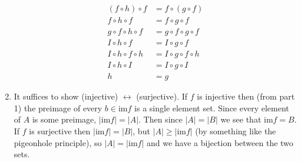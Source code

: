 \documentclass[]{article}
\newcommand{\abs}[1]{\left\vert #1 \right\vert}
\begin{document}
\begin{enumerate}
\begin{align}
(f \circ h) \circ f &= f \circ (g \circ f) \\
f \circ h \circ f &= f \circ g \circ f \\
g \circ f \circ h \circ f &= g \circ f \circ g \circ f \\
I \circ h \circ f &= I \circ g \circ f \\
I \circ h \circ f \circ h &= I \circ g \circ f \circ h \\
I \circ h \circ I &= I \circ g \circ I \\
h &= g
\end{align}
\item It suffices to show (injective) $\leftrightarrow$ (surjective). If $f$ is injective then (from part 1) the preimage of every $b \in \text{im}f$ is a single element set. Since every element of $A$ is some preimage, $\abs{\text{im}f} = \abs{A}$. Then since $\abs{A} = \abs{B}$ we see that $\text{im}f = B$. If $f$ is surjective then $\abs{\text{im}f} = \abs{B}$, but $\abs{A} \geq \abs{\text{im}f}$ (by something like the pigeonhole principle), so $\abs{A} = \abs{\text{im}f}$ and we have a bijection between the two sets.
\end{enumerate}
\end{document}

